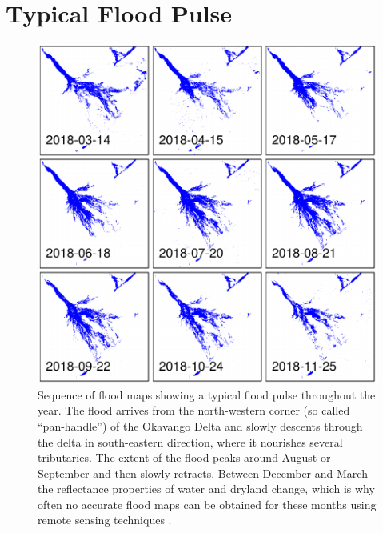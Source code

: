 \documentclass[abstract=off,10pt,a4paper,bibliography=totocnumbered]{article}
\begin{document}
\newpage
\section{Typical Flood Pulse}

\begin{figure}[hbtp]
  \begin{center}
    \includegraphics[width = \textwidth]{99_FloodPulse.pdf}
    \caption{Sequence of flood maps showing a typical flood pulse throughout the
    year. The flood arrives from the north-western corner (so called
    ``pan-handle'') of the Okavango Delta and slowly descents through the delta
    in south-eastern direction, where it nourishes several tributaries. The
    extent of the flood peaks around August or September and then slowly
    retracts. Between December and March the reflectance properties of water and
    dryland change, which is why often no accurate flood maps can be obtained
    for these months using remote sensing techniques \citep{Wolski.2017}.}
    \label{FloodPulse}
  \end{center}
\end{figure}
\end{document}
